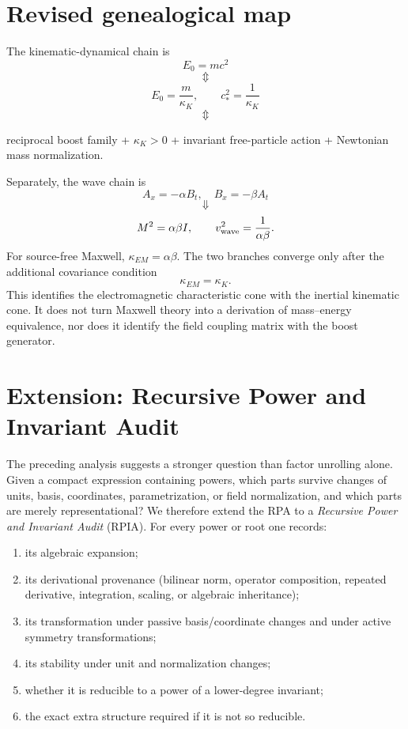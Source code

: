 \documentclass[11pt,a4paper]{article}
\begin{document}
\section{Revised genealogical map}
The kinematic-dynamical chain is
\begin{equation}
\boxed{E_0=mc^2}
\end{equation}
\[
\Updownarrow
\]
\begin{equation}
E_0=\frac{m}{\kappa_K},
\qquad
c_*^2=\frac1{\kappa_K}
\end{equation}
\[
\Updownarrow
\]
\begin{center}
reciprocal boost family + $\kappa_K>0$ + invariant free-particle action + Newtonian mass normalization.
\end{center}
Separately, the wave chain is
\begin{equation}
A_x=-\alpha B_t,\quad B_x=-\beta A_t
\end{equation}
\[
\Downarrow
\]
\begin{equation}
M^2=\alpha\beta I,
\qquad
v_{\rm wave}^2=\frac1{\alpha\beta}.
\end{equation}
For source-free Maxwell, $\kappa_{EM}=\alpha\beta$. The two branches converge only after the additional covariance condition
\begin{equation}
\boxed{\kappa_{EM}=\kappa_K}.
\end{equation}
This identifies the electromagnetic characteristic cone with the inertial kinematic cone. It does not turn Maxwell theory into a derivation of mass--energy equivalence, nor does it identify the field coupling matrix with the boost generator.


\section{Extension: Recursive Power and Invariant Audit}
The preceding analysis suggests a stronger question than factor unrolling alone.  Given a compact expression containing powers, which parts survive changes of units, basis, coordinates, parametrization, or field normalization, and which parts are merely representational?  We therefore extend the RPA to a \emph{Recursive Power and Invariant Audit} (RPIA).  For every power or root one records:
\begin{enumerate}
\item its algebraic expansion;
\item its derivational provenance (bilinear norm, operator composition, repeated derivative, integration, scaling, or algebraic inheritance);
\item its transformation under passive basis/coordinate changes and under active symmetry transformations;
\item its stability under unit and normalization changes;
\item whether it is reducible to a power of a lower-degree invariant;
\item the exact extra structure required if it is not so reducible.
\end{enumerate}
\end{document}

